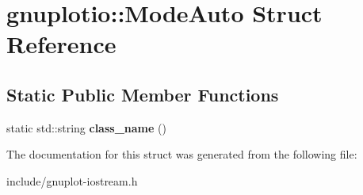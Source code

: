 \hypertarget{structgnuplotio_1_1ModeAuto}{}\section{gnuplotio\+:\+:Mode\+Auto Struct Reference}
\label{structgnuplotio_1_1ModeAuto}
\subsection*{Static Public Member Functions}
\begin{DoxyCompactItemize}
\item 
\mbox{\label{structgnuplotio_1_1ModeAuto_ac73f89a782ac32dd8bc7b8f7a7581523}} 
static std\+::string {\bfseries class\+\_\+name} ()
\end{DoxyCompactItemize}


The documentation for this struct was generated from the following file\+:\begin{DoxyCompactItemize}
\item 
include/gnuplot-\/iostream.\+h\end{DoxyCompactItemize}
